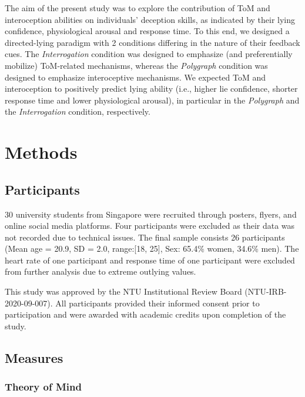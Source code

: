 \documentclass[
  man,mask,floatsintext]{apa6}
\begin{document}
The aim of the present study was to explore the contribution of ToM and interoception abilities on individuals' deception skills, as indicated by their lying confidence, physiological arousal and response time. To this end, we designed a directed-lying paradigm with 2 conditions differing in the nature of their feedback cues. The \emph{Interrogation} condition was designed to emphasize (and preferentially mobilize) ToM-related mechanisms, whereas the \emph{Polygraph} condition was designed to emphasize interoceptive mechanisms. We expected ToM and interoception to positively predict lying ability (i.e., higher lie confidence, shorter response time and lower physiological arousal), in particular in the \emph{Polygraph} and the \emph{Interrogation} condition, respectively.

\hypertarget{methods}{%
\section{Methods}\label{methods}}

\hypertarget{participants}{%
\subsection{Participants}\label{participants}}

30 university students from Singapore were recruited through posters, flyers, and online social media platforms.
Four participants were excluded as their data was not recorded due to technical issues. The final sample consists 26 participants (Mean age = 20.9, SD = 2.0, range:{[}18, 25{]}, Sex: 65.4\% women, 34.6\% men). The heart rate of one participant and response time of one participant were excluded from further analysis due to extreme outlying values.

This study was approved by the NTU Institutional Review Board (NTU-IRB-2020-09-007). All participants provided their informed consent prior to participation and were awarded with academic credits upon completion of the study.

\hypertarget{measures}{%
\subsection{Measures}\label{measures}}

\hypertarget{theory-of-mind}{%
\subsubsection{Theory of Mind}\label{theory-of-mind}}
\end{document}
